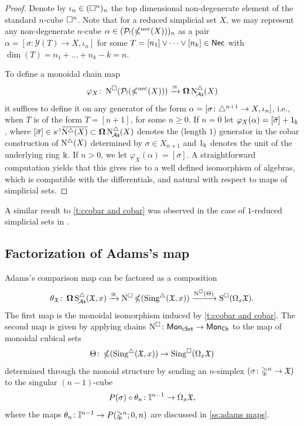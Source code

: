 \begin{proof}
	Denote by $\iota_n \in (\square^n)_n$ the top dimensional non-degenerate element of the standard $n$-cube $\square^n$.
	Note that for a reduced simplicial set $X$, we may represent any non-degenerate $n$-cube $\alpha \in (\mathcal{P}_!(\operatorname{\mathbb{\Omega}^{\mathrm{nec}}}(X)))_n$ as a pair $\alpha = [\sigma \colon \mathcal{Y}(T) \to X, \iota_n]$ for some $T = [n_1] \vee \dots \vee [n_k] \in \mathsf{Nec}$ with $\dim(T) = n_1 + \dots + n_k - k = n$.

	To define a monoidal chain map
	\[
	\varphi_X \colon \operatorname{N^{\square}}(\mathcal{P}_!(\operatorname{\mathbb{\Omega}^{\mathrm{nec}}}(X))) \xrightarrow{\cong} \operatorname{\mathbf{\Omega}} \operatorname{N^{\triangle}_{\!{\mathcal{A}\mathsf{s}}}}(X)
	\]
	it suffices to define it on any generator of the form $\alpha=[\sigma \colon \triangle^{n+1} \to X, \iota_{n}]$, i.e., when $T$ is of the form $T = [n+1]$, for some $n \geq 0$.
	If $n = 0$ let $\varphi_X(\alpha)= [\overline{\sigma}] + 1_\Bbbk$, where $[\overline{\sigma}] \in \s{-1} \overline{ \schains(X)} \subset \cobar \schainsA(X)$ denotes the (length $1$) generator in the cobar construction of $\operatorname{N^{\triangle}}(X)$ determined by $\sigma \in X_{n+1}$ and $1_\Bbbk$ denotes the unit of the underlying ring $\Bbbk$.
	If $n > 0$, we let $\varphi_X(\alpha)=[\overline{\sigma}]$.
	A straightforward computation yields that this gives rise to a well defined isomorphism of algebras, which is compatible with the differentials, and natural with respect to maps of simplicial sets.
\end{proof}

A similar result to \cref{t:ccobar and cobar} was observed in the case of $1$-reduced simplicial sets in \cite[Section~3.5]{berger1995loops}.

\subsection{Factorization of Adams's map}\label{ss:factorization of adams}

Adams's comparison map can be factored as a composition
\begin{equation}\label{e:factorization of adams}
	\theta_{\mathfrak{X}} \colon \operatorname{\mathbf{\Omega}} \operatorname{S^{\triangle}_{\!{\mathcal{A}\mathsf{s}}}}(\mathfrak{X},x) \xrightarrow{\cong}
	\operatorname{N^{\square}} \operatorname{\mathbb{\Omega}}(\operatorname{Sing^{\triangle}}(\mathfrak{X},x)) \xrightarrow{\operatorname{N^{\square}}(\Theta)}
	\operatorname{S^{\square}}(\Omega_x \mathfrak{X}).
\end{equation}
The first map is the monoidal isomorphism induced by \cref{t:ccobar and cobar}.
The second map is given by applying chains $\operatorname{N^{\square}} \colon \mathsf{Mon}_{\mathsf{cSet}} \to \mathsf{Mon}_{\mathsf{Ch}}$ to the map of monoidal cubical sets
\[
\Theta \colon \operatorname{\mathbb{\Omega}}(\operatorname{Sing^{\triangle}}(\mathfrak{X},x)) \to \operatorname{Sing^{\square}}(\Omega_x \mathfrak{X})
\]
determined through the monoid structure by sending an $n$-simplex $(\sigma \colon \mathbb{\Delta}^n \to \mathfrak{X})$ to the singular $(n-1)$-cube
\[
P(\sigma) \circ \theta_n \colon \mathbb{I}^{n-1} \to \Omega_x \mathfrak{X},
\]
where the maps $\theta_n \colon \mathbb{I}^{n-1} \to P(\mathbb{\Delta}^n;0,n)$ are discussed in \cref{ss:adams maps}.

